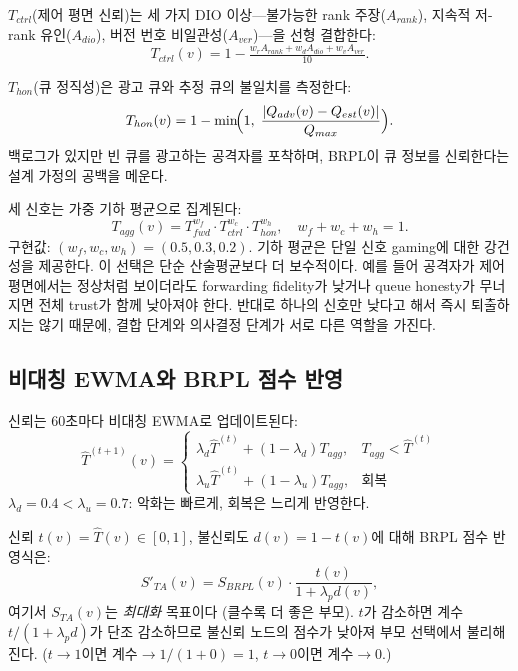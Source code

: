 \documentclass[10pt,a4paper,twocolumn]{article}
\begin{document}
\textbf{$T_{ctrl}$}(제어 평면 신뢰)는 세 가지 DIO 이상---불가능한 rank 주장($A_{rank}$),
지속적 저-rank 유인($A_{dio}$), 버전 번호 비일관성($A_{ver}$)---을 선형 결합한다:
\begin{equation}
  T_{ctrl}(v) = 1 - \tfrac{w_r A_{rank}+w_d A_{dio}+w_v A_{ver}}{10}.
  \label{eq:tctrl}
\end{equation}

\textbf{$T_{hon}$}(큐 정직성)은 광고 큐와 추정 큐의 불일치를 측정한다:
\begin{equation}
  T_{hon}(v) = 1-\min\!\Bigl(1,\;\frac{|Q_{adv}(v)-Q_{est}(v)|}{Q_{max}}\Bigr).
  \label{eq:thon}
\end{equation}
백로그가 있지만 빈 큐를 광고하는 공격자를 포착하며,
BRPL이 큐 정보를 신뢰한다는 설계 가정의 공백을 메운다.

세 신호는 가중 기하 평균으로 집계된다:
\begin{equation}
  T_{agg}(v) = T_{fwd}^{w_f}\cdot T_{ctrl}^{w_c}\cdot T_{hon}^{w_h},\quad
  w_f{+}w_c{+}w_h=1.
  \label{eq:tagg}
\end{equation}
구현값: $(w_f,w_c,w_h)=(0.5,0.3,0.2)$.
기하 평균은 단일 신호 gaming에 대한 강건성을 제공한다.
이 선택은 단순 산술평균보다 더 보수적이다.
예를 들어 공격자가 제어 평면에서는 정상처럼 보이더라도
forwarding fidelity가 낮거나 queue honesty가 무너지면
전체 trust가 함께 낮아져야 한다.
반대로 하나의 신호만 낮다고 해서 즉시 퇴출하지는 않기 때문에,
결합 단계와 의사결정 단계가 서로 다른 역할을 가진다.

\subsection{비대칭 EWMA와 BRPL 점수 반영}

신뢰는 60초마다 비대칭 EWMA로 업데이트된다:
\begin{equation}
  \hat{T}^{(t+1)}(v)=
  \begin{cases}
    \lambda_{d}\hat{T}^{(t)}+(1{-}\lambda_{d})T_{agg}, & T_{agg}<\hat{T}^{(t)}\\
    \lambda_{u}\hat{T}^{(t)}+(1{-}\lambda_{u})T_{agg}, & \text{회복}
  \end{cases}
  \label{eq:ewma}
\end{equation}
$\lambda_d=0.4<\lambda_u=0.7$: 악화는 빠르게, 회복은 느리게 반영한다.

신뢰 $t(v)=\hat{T}(v)\in[0,1]$, 불신뢰도 $d(v)=1-t(v)$에 대해
BRPL 점수 반영식은:
\begin{equation}
  S'_{TA}(v)=S_{BRPL}(v)\cdot\frac{t(v)}{1+\lambda_p d(v)},
  \label{eq:penalty}
\end{equation}
여기서 $S_{TA}(v)$는 \emph{최대화} 목표이다 (클수록 더 좋은 부모).
$t$가 감소하면 계수 $t/(1+\lambda_p d)$가 단조 감소하므로
불신뢰 노드의 점수가 낮아져 부모 선택에서 불리해진다.
($t\to1$이면 계수$\to 1/(1+0)=1$, $t\to0$이면 계수$\to0$.)
\end{document}
